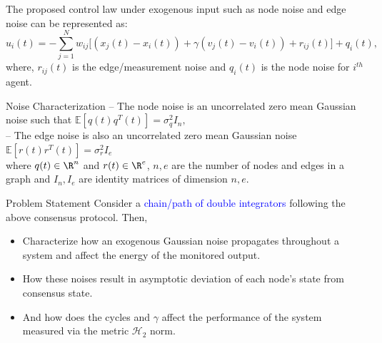 \begin{frame}{}
	\vspace{-0.1cm}
		The proposed control law under exogenous input such as node noise and edge noise can be represented as:\vspace{-0.2cm}
	\begin{equation*}
		u_i(t)=-\sum_{j=1}^{N}{w_{ij}[(x_j(t)-x_i(t))}+\gamma{(v_j(t)-v_i(t))}+r_{ij}(t)]+q_i(t),
	\end{equation*}
	where, $r_{ij}(t)$ is the edge/measurement noise and $q_i(t)$ is the node noise for $i^{th}$ agent. 
	\vspace{-0.1cm}
		\begin{block}{Noise Characterization}
		-- The node noise is an uncorrelated zero mean Gaussian noise such that $\mathbb{E}[q(t)q^T(t)]=\sigma_{q}^2I_n,$\\
		-- The edge noise is also an uncorrelated zero mean Gaussian noise $\mathbb{E}[r(t)r^T(t)]=\sigma_{r}^2I_e$\\
		where $q(t) \in \R^n$ and $r(t) \in \R^e$, $n,e$ are the number of nodes and edges in a graph and $I_n,I_e$ are identity matrices of dimension $n,e$.
	\end{block}
	\vspace*{-0.2cm}
	\pause
	\begin{block}{Problem Statement}
		Consider a \textcolor{blue}{chain/path of double integrators} following the above consensus protocol. Then,
		\begin{itemize}
			\item Characterize how an exogenous Gaussian noise propagates throughout a system and affect the energy of the monitored output.
			\item How these noises result in asymptotic deviation of each node's state from consensus state. 
			\item And how does the cycles and $\gamma$ affect the performance of the system measured via the metric $\mathcal{H}_2$ norm.
		\end{itemize}
		\end{block}
\end{frame}
